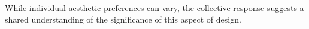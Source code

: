 
While individual aesthetic preferences can vary, the collective response suggests a shared understanding of the significance of this aspect of design.







